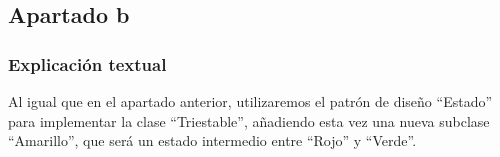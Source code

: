 \documentclass[11pt,a4paper]{article}
\begin{document}
\begin{figure}[H]
\end{figure}

\begin{figure}[H]
\end{figure}

\subsection{Apartado b}

\subsubsection{Explicación textual}

Al igual que en el apartado anterior, utilizaremos el patrón de diseño ``Estado'' para implementar la clase ``Triestable'', añadiendo esta vez una nueva subclase ``Amarillo'', que será un estado intermedio entre ``Rojo'' y ``Verde''.
\end{document}
